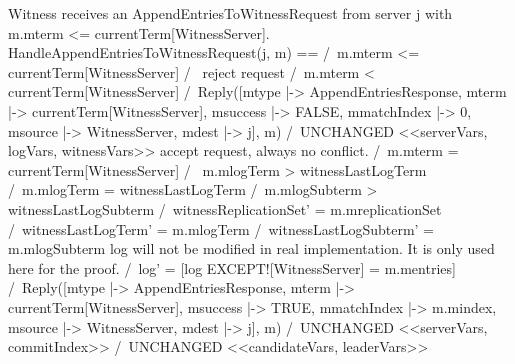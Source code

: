 \documentclass{standalone}
\begin{document}
\onehalfspacing

    \begin{tla}

\* Witness receives an AppendEntriesToWitnessRequest from server j with
\* m.mterm <= currentTerm[WitnessServer]. 
HandleAppendEntriesToWitnessRequest(j, m) ==
    /\ m.mterm <= currentTerm[WitnessServer]
    /\ \/ \* reject request
          /\ m.mterm < currentTerm[WitnessServer]
          /\ Reply([mtype           |-> AppendEntriesResponse,
                    mterm           |-> currentTerm[WitnessServer],
                    msuccess        |-> FALSE,
                    mmatchIndex     |-> 0,
                    msource         |-> WitnessServer,
                    mdest           |-> j],
                    m)
          /\ UNCHANGED <<serverVars, logVars, witnessVars>>
       \/ \* accept request, always no conflict.
          /\ m.mterm = currentTerm[WitnessServer]
          /\ \/ m.mlogTerm > witnessLastLogTerm
             \/ /\ m.mlogTerm = witnessLastLogTerm
                /\ m.mlogSubterm > witnessLastLogSubterm
          /\ witnessReplicationSet' = m.mreplicationSet
          /\ witnessLastLogTerm' = m.mlogTerm
          /\ witnessLastLogSubterm' = m.mlogSubterm
          \* log will not be modified in real implementation. It is only
          \* used here for the proof.
          /\ log' = [log EXCEPT![WitnessServer] = m.mentries]
          /\ Reply([mtype           |-> AppendEntriesResponse,
                    mterm           |-> currentTerm[WitnessServer],
                    msuccess        |-> TRUE,
                    mmatchIndex     |-> m.mindex,
                    msource         |-> WitnessServer,
                    mdest           |-> j],
                    m)
          /\ UNCHANGED <<serverVars, commitIndex>>
    /\ UNCHANGED <<candidateVars, leaderVars>>


    \end{tla}
\end{document}
